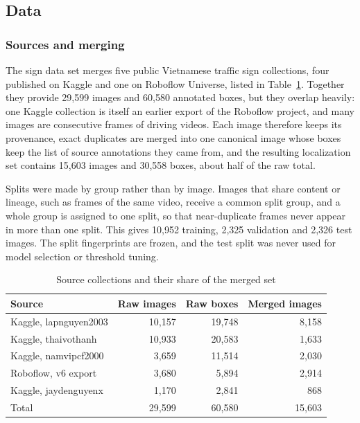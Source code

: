 \documentclass[conference,a4paper]{IEEEtran}
\begin{document}
\subsection{Data}\label{sec:data}

\subsubsection{Sources and merging}

The sign data set merges five public Vietnamese traffic sign collections, four published on Kaggle and one on Roboflow Universe, listed in Table~\ref{tab:sources}. Together they provide 29,599 images and 60,580 annotated boxes, but they overlap heavily: one Kaggle collection is itself an earlier export of the Roboflow project, and many images are consecutive frames of driving videos. Each image therefore keeps its provenance, exact duplicates are merged into one canonical image whose boxes keep the list of source annotations they came from, and the resulting localization set contains 15,603 images and 30,558 boxes, about half of the raw total.

Splits were made by group rather than by image. Images that share content or lineage, such as frames of the same video, receive a common split group, and a whole group is assigned to one split, so that near-duplicate frames never appear in more than one split. This gives 10,952 training, 2,325 validation and 2,326 test images. The split fingerprints are frozen, and the test split was never used for model selection or threshold tuning.

\begin{table}[t]
\centering
\caption{Source collections and their share of the merged set}
\label{tab:sources}
\begin{tabular}{lrrr}
\toprule
Source & Raw images & Raw boxes & Merged images \\
\midrule
Kaggle, lapnguyen2003 & 10,157 & 19,748 & 8,158 \\
Kaggle, thaivothanh & 10,933 & 20,583 & 1,633 \\
Kaggle, namvipcf2000 & 3,659 & 11,514 & 2,030 \\
Roboflow, v6 export & 3,680 & 5,894 & 2,914 \\
Kaggle, jaydenguyenx & 1,170 & 2,841 & 868 \\
\midrule
Total & 29,599 & 60,580 & 15,603 \\
\bottomrule
\end{tabular}
\end{table}
\end{document}

